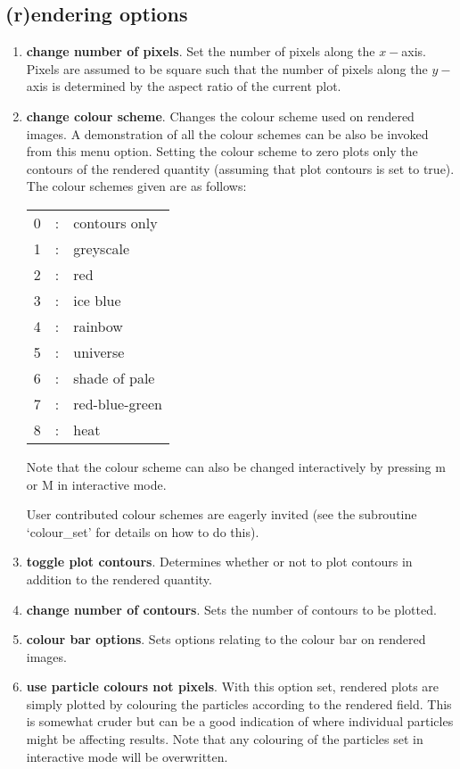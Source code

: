 \documentclass[a4paper,11pt]{article}
\begin{document}
\subsection{(r)endering options}
\begin{enumerate}
\item \textbf{change number of pixels}. Set the number of pixels along the
$x-$axis. Pixels are assumed to be square such that the number of pixels along
the $y-$axis is determined by the aspect ratio of the current plot.
\item \textbf{change colour scheme}. Changes the colour scheme used on rendered
images. A demonstration of all the colour schemes can be also be invoked from
this menu option. Setting the colour scheme to zero plots only the contours of
the rendered quantity (assuming that plot contours is set to true). The colour
schemes given are as follows:

\begin{tabular}{rcp{}}
  0 & : & contours only \\
  1 & : & greyscale \\
  2 & : & red \\
  3 & : & ice blue \\
  4 & : & rainbow \\
  5 & : & universe \\
  6 & : & shade of pale \\
  7 & : & red-blue-green \\
  8 & : & heat
\end{tabular}

Note that the colour scheme can also be changed interactively by pressing m or M
in interactive mode.

 User contributed colour schemes are eagerly invited (see the subroutine
`colour\_set' for details on how to do this).

\item \textbf{toggle plot contours}. Determines whether or not to plot contours
in addition to the rendered quantity.
\item \textbf{change number of contours}. Sets the number of contours to be
plotted. 
\item \textbf{colour bar options}. Sets options relating to the colour
bar on rendered images.
\item \textbf{use particle colours not pixels}. With this option set, rendered plots are
simply plotted by colouring the particles according to the rendered field. This is somewhat
cruder but can be a good indication of where individual particles might be affecting results.
Note that any colouring of the particles set in interactive mode will be overwritten.
\end{enumerate}
\end{document}
